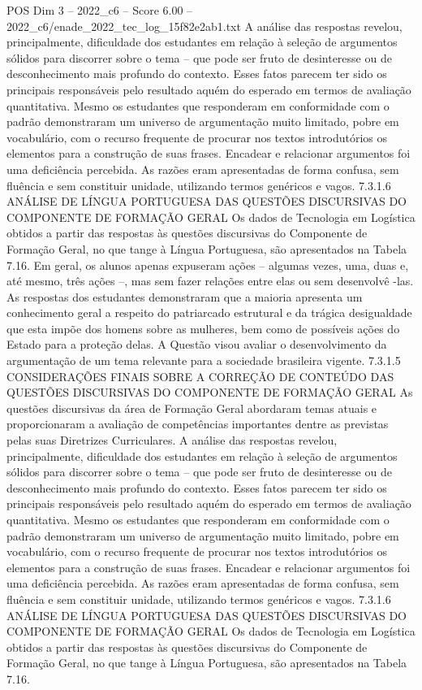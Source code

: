 \begin{textsample}{POS Dim 3 – 2022\_c6 – Score 6.00 – 2022\_c6/enade\_2022\_tec\_log\_15f82e2ab1.txt}
A análise das respostas revelou, principalmente, dificuldade dos estudantes em relação à seleção de argumentos sólidos para discorrer sobre o tema – que pode ser fruto de desinteresse ou de desconhecimento mais profundo do contexto.
Esses fatos parecem ter sido os principais responsáveis pelo resultado aquém do esperado em termos de avaliação quantitativa.
Mesmo os estudantes que responderam em conformidade com o padrão demonstraram um universo de argumentação muito limitado, pobre em vocabulário, com o recurso frequente de procurar nos textos introdutórios os elementos para a construção de suas frases.
Encadear e relacionar argumentos foi uma deficiência percebida.
As razões eram apresentadas de forma confusa, sem fluência e sem constituir unidade, utilizando termos genéricos e vagos. 7.3.1.6 ANÁLISE DE LÍNGUA PORTUGUESA DAS QUESTÕES DISCURSIVAS DO COMPONENTE DE FORMAÇÃO GERAL Os dados de Tecnologia em Logística obtidos a partir das respostas às questões discursivas do Componente de Formação Geral, no que tange à Língua Portuguesa, são apresentados na Tabela 7.16.
Em geral, os alunos apenas expuseram ações – algumas vezes, uma, duas e, até mesmo, três ações –, mas sem fazer relações entre elas ou sem desenvolvê -las.
As respostas dos estudantes demonstraram que a maioria apresenta um conhecimento geral a respeito do patriarcado estrutural e da trágica desigualdade que esta impõe dos homens sobre as mulheres, bem como de possíveis ações do Estado para a proteção delas.
A Questão visou avaliar o desenvolvimento da argumentação de um tema relevante para a sociedade brasileira vigente. 7.3.1.5 CONSIDERAÇÕES FINAIS SOBRE A CORREÇÃO DE CONTEÚDO DAS QUESTÕES DISCURSIVAS DO COMPONENTE DE FORMAÇÃO GERAL As questões discursivas da área de Formação Geral abordaram temas atuais e proporcionaram a avaliação de competências importantes dentre as previstas pelas suas Diretrizes Curriculares.
A análise das respostas revelou, principalmente, dificuldade dos estudantes em relação à seleção de argumentos sólidos para discorrer sobre o tema – que pode ser fruto de desinteresse ou de desconhecimento mais profundo do contexto.
Esses fatos parecem ter sido os principais responsáveis pelo resultado aquém do esperado em termos de avaliação quantitativa.
Mesmo os estudantes que responderam em conformidade com o padrão demonstraram um universo de argumentação muito limitado, pobre em vocabulário, com o recurso frequente de procurar nos textos introdutórios os elementos para a construção de suas frases.
Encadear e relacionar argumentos foi uma deficiência percebida.
As razões eram apresentadas de forma confusa, sem fluência e sem constituir unidade, utilizando termos genéricos e vagos. 7.3.1.6 ANÁLISE DE LÍNGUA PORTUGUESA DAS QUESTÕES DISCURSIVAS DO COMPONENTE DE FORMAÇÃO GERAL Os dados de Tecnologia em Logística obtidos a partir das respostas às questões discursivas do Componente de Formação Geral, no que tange à Língua Portuguesa, são apresentados na Tabela 7.16.

\end{textsample}
